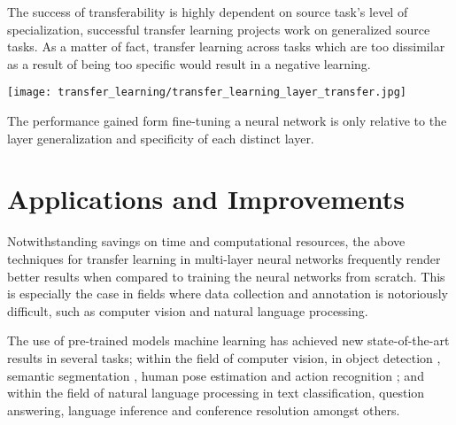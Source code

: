 The success of transferability is highly dependent on source task's level of specialization, successful transfer learning projects work on generalized source tasks. As a matter of fact, transfer learning across tasks which are too dissimilar as a result of being too specific would result in a negative learning.\citep{rosenstein2005}

\begin{marginfigure}
  \texttt{[image: transfer\_learning/transfer\_learning\_layer\_transfer.jpg]}
  \caption{The performance gained form fine-tuning a neural network is only relative to the layer generalization and specificity of each distinct layer.}
  \label{fig:transferlearning_pretrained_finetuning}
\end{marginfigure}

\section{Applications and Improvements}\label{sec:transfer-learning-applications-improvements}

Notwithstanding savings on time and computational resources, the above techniques for transfer learning in multi-layer neural networks frequently render better results when compared to training the neural networks from scratch.\citep{yosinski2014} This is especially the case in fields where data collection and annotation is notoriously difficult, such as computer vision and natural language processing. 

The use of pre-trained models machine learning has achieved new state-of-the-art results in several tasks; within the field of computer vision, in object detection \citep{he2017}, semantic segmentation \citep{zhao2016}, human pose estimation \citep{papandreou2017} and action recognition \citep{carreira2017} ; and within the field of natural language processing in text classification, question answering, language inference and conference resolution amongst others. \citep{howard2018} \citep{joshi2018}

